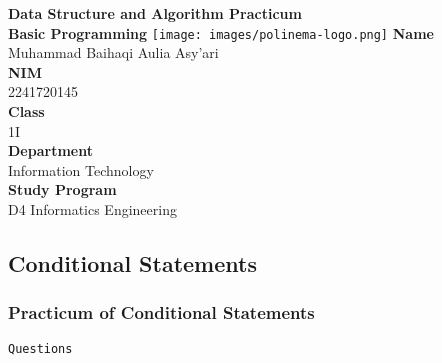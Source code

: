 \documentclass[12pt,titlepage]{article}
\newcommand{\vSubject}{Data Structure and Algorithm Practicum}
\newcommand{\vSubtitle}{Basic Programming}
\newcommand{\vName}{Muhammad Baihaqi Aulia Asy'ari}
\newcommand{\vNIM}{2241720145}
\newcommand{\vClass}{1I}
\newcommand{\vDepartment}{Information Technology}
\newcommand{\vStudyProgram}{D4 Informatics Engineering}
\begin{document}
\begin{titlepage}
    \centering
    \vfill
    {\bfseries\LARGE
        \vSubject\\
        \vskip0.25cm
        \vSubtitle
    }
    \vfill
    \texttt{[image: images/polinema-logo.png]}
    \vfill
    {
        \textbf{Name}\\
        \vName\\
        \vskip0.5cm
        \textbf{NIM}\\
        \vNIM\\
        \vskip0.5cm
        \textbf{Class}\\
        \vClass\\
        \vskip0.5cm
        \textbf{Department}\\
        \vDepartment\\
        \vskip0.5cm
        \textbf{Study Program}\\
        \vStudyProgram
    }
\end{titlepage}

\newpage

\setcounter{section}{1}
\setcounter{subsection}{1}
\subsection{Conditional Statements}
\subsubsection{Practicum of Conditional Statements}
\texttt{Questions}
\end{document}
